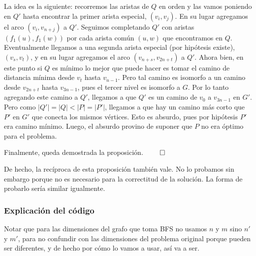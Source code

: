 \begin{itemize}
	 La idea es la siguiente: recorremos las aristas de $Q$ en orden y las vamos poniendo en $Q'$ hasta encontrar la primer arista especial, $(v_i, v_j)$. En su lugar agregamos el arco $(v_i, v_{n+j})$ a $Q'$. Seguimos completando $Q'$ con aristas $(f_1(u), f_1(w))$ por cada arista común $(u,w)$ que encontramos en $Q$. Eventualmente llegamos a una segunda arista especial (por hipótesis existe), $(v_s, v_t)$, y en su lugar agregamos el arco $(v_{n+s}, v_{2n+t})$ a $Q'$. Ahora bien, en este punto si $Q$ es mínimo lo mejor que puede hacer es tomar el camino de distancia mínima desde $v_t$ hasta $v_{n-1}$. Pero tal camino es isomorfo a un camino desde $v_{2n+t}$ hasta $v_{3n-1}$, pues el tercer nivel es isomorfo a $G$. Por lo tanto agregando este camino a $Q'$, llegamos a que $Q'$ es un camino de $v_0$ a $v_{3n-1}$ en $G'$. \\
	 Pero como $|Q'|=|Q|<|P|=|P'|$, llegamos a que hay un camino más corto que $P'$ en $G'$ que conecta los mismos vértices. Esto es absurdo, pues por hipótesis $P'$ era camino mínimo. Luego, el absurdo provino de suponer que $P$ no era óptimo para el problema.
\end{itemize}

Finalmente, queda demostrada la proposición. $\qed$

De hecho, la recíproca de esta proposición también vale. No lo probamos sin embargo porque no es necesario para la correctitud de la solución. La forma de probarlo sería similar igualmente.

\subsubsection{Explicación del código}

Notar que para las dimensiones del grafo que toma BFS no usamos $n$ y $m$ sino $n'$ y $m'$, para no confundir con las dimensiones del problema original porque pueden ser diferentes, y de hecho por cómo lo vamos a usar, así va a ser.

